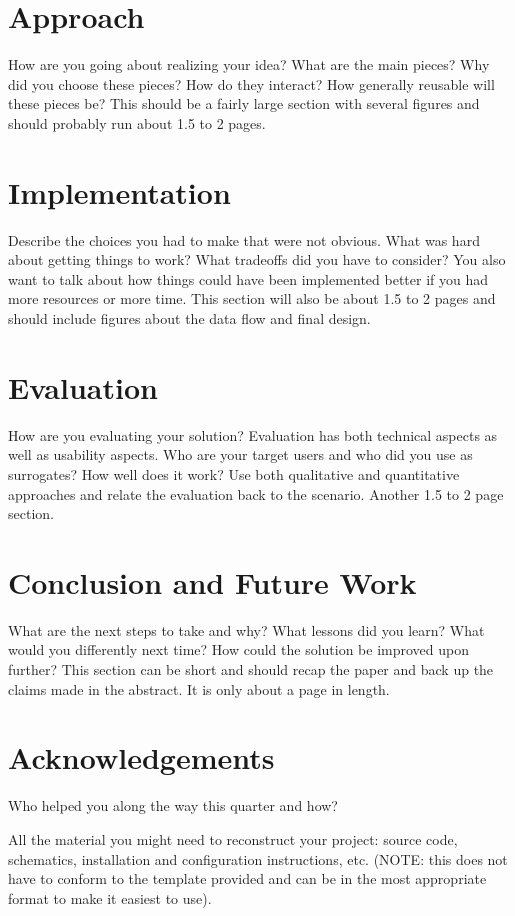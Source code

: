 \documentclass{acm_proc_article-sp}
\begin{document}
\section{Approach}
How are you going about realizing your idea?  What are the main pieces?  Why did you choose these pieces?  How do they interact?  How generally reusable will these pieces be?  This should be a fairly large section with several figures and should probably run about 1.5 to 2 pages.

\section{Implementation}
Describe the choices you had to make that were not obvious.  What was hard about getting things to work?  What tradeoffs did you have to consider?  You also want to talk about how things could have been implemented better if you had more resources or more time.  This section will also be about 1.5 to 2 pages and should include figures about the data flow and final design.

\section{Evaluation}
How are you evaluating your solution?  Evaluation has both technical aspects as well as usability aspects.  Who are your target users and who did you use as surrogates?  How well does it work?  Use both qualitative and quantitative approaches and relate the evaluation back to the scenario.  Another 1.5 to 2 page section.

\section{Conclusion and Future Work}
What are the next steps to take and why?  What lessons did you learn?  What would you differently next time?  How could the solution be improved upon further?  This section can be short and should recap the paper and back up the claims made in the abstract.  It is only about a page in length.

\section{Acknowledgements}
Who helped you along the way this quarter and how?


  
\balancecolumns

\appendix
All the material you might need to reconstruct your project: source code, schematics, installation and configuration instructions, etc.  (NOTE: this does not have to conform to the template provided and can be in the most appropriate format to make it easiest to use).
\end{document}
